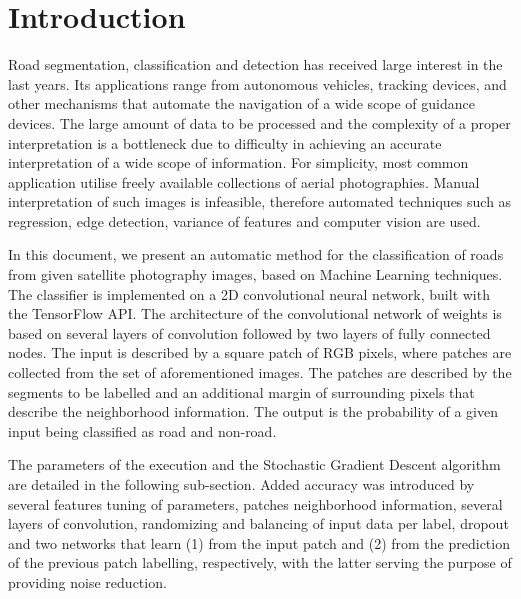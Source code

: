 \documentclass[fleqn,9 pt]{SelfArx} %
\affiliation{\textbf{Email (SCIPER):} \hspace{0.2cm} \textsuperscript{1} bruno.magalhaes@epfl.ch (212079) \hspace{0.2cm} \textsuperscript{2} riccardo.silini@epfl.ch (214398) \hspace{0.2cm}}
\begin{document}
\begin{sloppypar} %

\flushbottom %
\maketitle %
\tableofcontents %

\section{Introduction}

Road segmentation, classification and detection has received large interest in the last years. Its applications range from autonomous vehicles, tracking devices, and other mechanisms that automate the navigation of a wide scope of guidance devices. The large amount of data to be processed and the complexity of a proper interpretation is a bottleneck due to difficulty in achieving an accurate interpretation of a wide scope of information. For simplicity, most common application utilise freely available collections of aerial photographies. Manual interpretation of such images is infeasible, therefore automated techniques such as regression, edge detection, variance of features and computer vision are used.

In this document, we present an automatic method for the classification of roads from given satellite photography images, based on Machine Learning techniques. The classifier is implemented on a 2D convolutional neural network, built with the TensorFlow API. The architecture of the convolutional network of weights is based on several layers of convolution followed by two layers of fully connected nodes. The input is described by a square patch of RGB pixels, where patches are collected from the set of aforementioned images. The patches are described by the segments to be labelled and an additional margin of surrounding pixels that describe the neighborhood information. The output is the probability of a given input being classified as road and non-road.

The parameters of the execution and the Stochastic Gradient Descent algorithm are detailed in the following sub-section. Added accuracy was introduced by several features tuning of parameters, patches neighborhood information, several layers of convolution, randomizing and balancing of input data per label, dropout and two networks that learn (1) from the input patch and (2) from the prediction of the previous patch labelling, respectively, with the latter serving the purpose of providing noise reduction.


\end{sloppypar}
\end{document}
